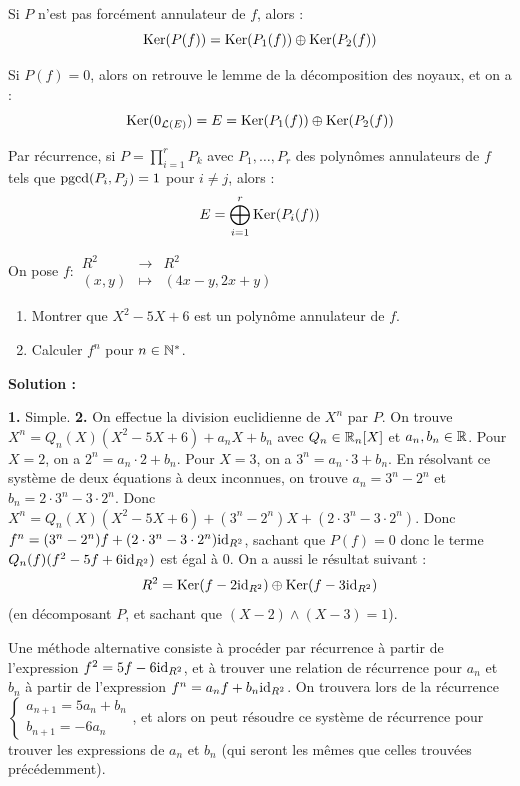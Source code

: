 \documentclass[12pt, a4paper]{report}
\begin{document}
\begin{remark}
    Si $P$ n'est pas forcément annulateur de $f$, alors :
    $$\mathrm{Ker}(P(f)) = \mathrm{Ker}(P_1(f)) \oplus \mathrm{Ker}(P_2(f))$$

    Si $P(f) = 0$, alors on retrouve le lemme de la décomposition des noyaux, et on a :
    $$\mathrm{Ker}(0_{\mathcal L(E)}) = E = \mathrm{Ker}(P_1(f)) \oplus \mathrm{Ker}(P_2(f))$$
\end{remark}

\begin{remark}
    Par récurrence, si $P = \prod_{i=1}^{r}P_k$ avec $P_1,\dots,P_r$ des polynômes annulateurs de $f$ tels que $\mathrm{pgcd}(P_i,P_j) = 1$ pour $i \neq j$, alors :
$$E = \bigoplus_{i=1}^{r} \mathrm{Ker}(P_i(f))$$
\end{remark}

\begin{exercise}
    On pose $f : \begin{matrix}
        R^2 &\to &R^2\\
        (x,y) &\mapsto &(4x-y, 2x+y)
    \end{matrix}$
    \begin{enumerate}
        \item Montrer que $X^2-5X+6$ est un polynôme annulateur de $f$.
        \item Calculer $f^n$ pour $n \in \mathbb{N}^*$.
    \end{enumerate}

    \textbf{Solution :}

    \begin{outline}
        \1 \textbf{1.} Simple.
        \1 \textbf{2.} On effectue la division euclidienne de $X^n$ par $P$. 
        \2 On trouve $X^n = Q_n(X)(X^2 - 5X + 6) + a_n X + b_n$ avec $Q_n \in \mathbb{R}_n[X]$ et $a_n,b_n \in \mathbb{R}$.
        \2 Pour $X=2$, on a $2^n = a_n \cdot 2 + b_n$.
        \2 Pour $X=3$, on a $3^n = a_n \cdot 3 + b_n$.
        \2 En résolvant ce système de deux équations à deux inconnues, on trouve $a_n = 3^n - 2^n$ et $b_n = 2 \cdot 3^n - 3 \cdot 2^n$.
        \2 Donc $X^n = Q_n(X)(X^2 - 5X + 6) + (3^n - 2^n)X + (2 \cdot 3^n - 3 \cdot 2^n)$.
        \1 Donc $f^n = (3^n - 2^n)f + (2 \cdot 3^n - 3 \cdot 2^n)\mathrm{id}_{R^2}$, sachant que $P(f) = 0$ donc le terme $Q_n(f)(f^2 - 5f + 6\mathrm{id}_{R^2})$ est égal à $0$.
        \1 On a aussi le résultat suivant :
        $$R^2 = \mathrm{Ker}(f - 2\mathrm{id}_{R^2}) \oplus \mathrm{Ker}(f - 3\mathrm{id}_{R^2})$$
        (en décomposant $P$, et sachant que $(X-2) \wedge (X-3) = 1$).
    \end{outline}

    Une méthode alternative consiste à procéder par récurrence à partir de l'expression $f^2 = 5f - 6\mathrm{id}_{R^2}$, et à trouver une relation de récurrence pour $a_n$ et $b_n$ à partir de l'expression $f^n = a_n f + b_n \mathrm{id}_{R^2}$. On trouvera lors de la récurrence $\begin{cases} a_{n+1} = 5a_n + b_n\\ b_{n+1} = -6a_n\end{cases}$, et alors on peut résoudre ce système de récurrence pour trouver les expressions de $a_n$ et $b_n$ (qui seront les mêmes que celles trouvées précédemment).
\end{exercise}
\end{document}
